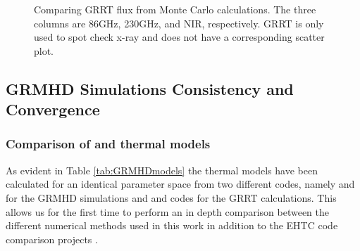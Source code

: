 \begin{figure}
    \centering
    \caption{Comparing GRRT flux from Monte Carlo calculations.  The three columns are 86GHz, 230GHz, and NIR, respectively.  GRRT is only used to spot check x-ray and does not have a corresponding scatter plot.}
    \label{fig:sed_vv}
\end{figure}

\subsection{GRMHD Simulations Consistency and Convergence}\label{app:resolution_study}


\subsubsection{Comparison of \kharma and \bhac thermal models}

As evident in Table \ref{tab:GRMHDmodels} the thermal models have been calculated for an identical parameter space from two different codes, namely \kharma and \bhac for the GRMHD simulations and \ipole and \bhoss codes for the GRRT calculations. This allows us for the first time to perform an in depth comparison between the different numerical methods used in this work in addition to the EHTC code comparison projects \citep{2019ApJS..243...26P,2020ApJ...897..148G}.

